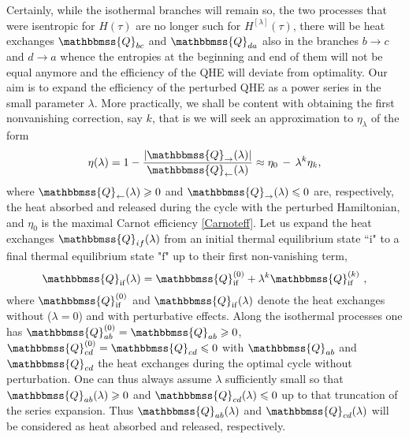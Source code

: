 \documentclass[aps,pra,floatfix,twocolumn,groupedaddress,superscriptaddress,nofootinbib,notitlepage,amsmath,amssymb,]{revtex4-1}
\begin{document}
Certainly, while the isothermal branches will remain so, the two processes that were isentropic for $H(\tau)$ are no longer such for $H^{[\lambda]}(\tau)$, there will be heat exchanges $\mathbbmss{Q}_{bc}$ and $\mathbbmss{Q}_{da}$ also in the branches $b\rightarrow c$ and $d\rightarrow a$ whence the entropies at the beginning and end of them will not be equal anymore and the efficiency of the QHE will deviate from optimality. Our aim is to expand the efficiency of the perturbed QHE as a power series in the small parameter $\lambda$. More practically, we shall be content with obtaining the first nonvanishing correction, say $k $, that is we will seek an approximation to $\eta_\lambda$ of the form 
\begin{equation}
\label{effexp}
\eta(\lambda)=1-\frac{\left|\mathbbmss{Q}_{\rightarrow}(\lambda)\right|}{\mathbbmss{Q}_{\leftarrow}(\lambda)}\approx \eta_0\,-\,\lambda^{k}\eta_{k},
\end{equation}
where $\mathbbmss{Q}_{\leftarrow}(\lambda)\geqslant 0$ and $\mathbbmss{Q}_{\rightarrow}(\lambda)\leqslant 0$ are, respectively, the heat absorbed and released during the cycle with the perturbed Hamiltonian, and $\eta_{0}$ is the maximal Carnot efficiency \eqref{Carnoteff}.
Let us expand the heat exchanges $\mathbbmss{Q}_{if}(\lambda)$ from an initial thermal equilibrium state ``$\mathrm{i}$" to a final thermal equilibrium state "$\mathrm{f}$" up to their first non-vanishing term, 
\begin{equation}
\label{heatpertgen}
\mathbbmss{Q}_{\mathrm{if}}(\lambda)=\mathbbmss{Q}_{\mathrm{if}}^{(0)}+\lambda^{k}\mathbbmss{Q}^{(k )}_{\mathrm{if}}\ ,
\end{equation}
where $\mathbbmss{Q}_{\mathrm{if}}^{(0)}$ and $\mathbbmss{Q}_{\mathrm{if}}(\lambda)$ denote the heat exchanges without ($\lambda=0$) and with perturbative effects.
Along the isothermal processes one has
$\mathbbmss{Q}_{ab}^{(0)}=\mathbbmss{Q}_{ab}\geqslant 0$, $\mathbbmss{Q}_{cd}^{(0)}=\mathbbmss{Q}_{cd}\leqslant 0$ with $\mathbbmss{Q}_{ab}$ and $\mathbbmss{Q}_{cd}$ the heat exchanges during the optimal cycle without perturbation. One can thus
always assume $\lambda$ sufficiently small so that $\mathbbmss{Q}_{ab}(\lambda)\geqslant 0$ and $\mathbbmss{Q}_{cd}(\lambda)\leqslant 0$ up to that truncation of the series expansion. Thus $\mathbbmss{Q}_{ab}(\lambda)$ and $\mathbbmss{Q}_{cd}(\lambda)$ will be considered as heat absorbed and released, respectively. 
\end{document}
